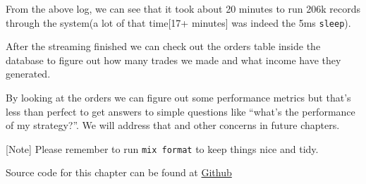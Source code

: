 \documentclass[
]{book}
\newenvironment{Shaded}{\begin{snugshade}}{\end{snugshade}}
\newcommand{\AttributeTok}[1]{\textcolor[rgb]{0.77,0.63,0.00}{#1}}
\newcommand{\ErrorTok}[1]{\textcolor[rgb]{0.64,0.00,0.00}{\textbf{#1}}}
\newcommand{\ExtensionTok}[1]{#1}
\newcommand{\KeywordTok}[1]{\textcolor[rgb]{0.13,0.29,0.53}{\textbf{#1}}}
\newcommand{\NormalTok}[1]{#1}
\newcommand{\StringTok}[1]{\textcolor[rgb]{0.31,0.60,0.02}{#1}}
\newcommand{\VariableTok}[1]{\textcolor[rgb]{0.00,0.00,0.00}{#1}}
\begin{document}
From the above log, we can see that it took about 20 minutes to run 206k records through the system(a lot of that time{[}17+ minutes{]} was indeed the 5ms \texttt{sleep}).

After the streaming finished we can check out the orders table inside the database to figure out how many trades we made and what income have they generated.

\begin{Shaded}
\end{Shaded}

By looking at the orders we can figure out some performance metrics but that's less than perfect to get answers to simple questions like ``what's the performance of my strategy?''. We will address that and other concerns in future chapters.

{[}Note{]} Please remember to run \texttt{mix\ format} to keep things nice and tidy.

Source code for this chapter can be found at \href{https://github.com/frathon/create-a-cryptocurrency-trading-bot-in-elixir-source-code/tree/chapter_15}{Github}
\end{document}
